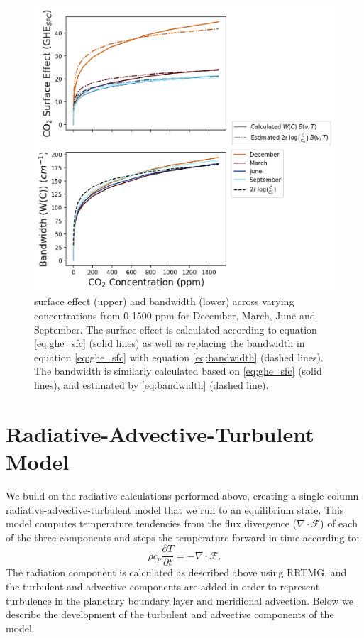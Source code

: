 \documentclass[draft]{agujournal2019}
\begin{document}
\begin{figure}[htb!]
\noindent\includegraphics[width=1\textwidth]{sfc_bandwidth_and_co2.png}
\centering
\caption{ surface effect (upper) and bandwidth (lower) across varying  concentrations from 0-1500 ppm for December, March, June and September. The  surface effect is calculated according to equation \ref{eq:ghe_sfc} (solid lines) as well as replacing the bandwidth in equation \ref{eq:ghe_sfc} with equation \ref{eq:bandwidth} (dashed lines). The bandwidth is similarly calculated based on \ref{eq:ghe_sfc} (solid lines), and estimated by \ref{eq:bandwidth} (dashed line).}
\label{fig:sfc_bandwidth_co2}
\end{figure}


\section{Radiative-Advective-Turbulent Model}

We build on the radiative calculations performed above, creating a single column radiative-advective-turbulent model that we run to an equilibrium state. This model computes temperature tendencies from the flux divergence ($\nabla \cdot \mathcal{F}$) of each of the three components and steps the temperature forward in time according to:
\begin{equation}
    \rho c_{p} \frac{\partial T}{\partial t} = -\nabla \cdot \mathbf{\mathcal{F}}.
\end{equation}
The radiation component is calculated as described above using RRTMG, and the turbulent and advective components are added in order to represent turbulence in the planetary boundary layer and meridional advection. Below we describe the development of the turbulent and advective components of the model.
\end{document}
